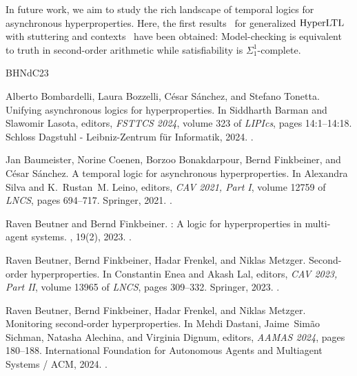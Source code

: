 \documentclass[dvipsnames,10pt,a4paper]{amsart}
\theoremstyle{definition}
\theoremstyle{remark}
\newcommand{\hyltl}{\mathrm{Hyper\-LTL}\xspace}
\begin{document}
In future work, we aim to study the rich landscape of temporal logics for asynchronous hyperproperties. 
Here, the first results~\cite{rz25} for generalized $\hyltl$ with stuttering and contexts~\cite{DBLP:journals/corr/abs-2404-16778} have been obtained: 
Model-checking is equivalent to truth in second-order arithmetic while satisfiability is $\Sigma_1^1$-complete.

\newcommand{\etalchar}[1]{$^{#1}$}
\begin{thebibliography}{BHNdC23}

Alberto Bombardelli, Laura Bozzelli, C{\'{e}}sar S{\'{a}}nchez, and Stefano
  Tonetta.
\newblock Unifying asynchronous logics for hyperproperties.
\newblock In Siddharth Barman and Slawomir Lasota, editors, {\em {FSTTCS}
  2024}, volume 323 of {\em LIPIcs}, pages 14:1--14:18. Schloss Dagstuhl -
  Leibniz-Zentrum für Informatik, 2024.
\newblock \href {https://doi.org/10.4230/LIPICS.FSTTCS.2024.14}
  {}.

\bibitem[BCB{\etalchar{+}}21]{DBLP:conf/cav/BaumeisterCBFS21}
Jan Baumeister, Norine Coenen, Borzoo Bonakdarpour, Bernd Finkbeiner, and
  C{\'{e}}sar S{\'{a}}nchez.
\newblock A temporal logic for asynchronous hyperproperties.
\newblock In Alexandra Silva and K.~Rustan~M. Leino, editors, {\em {CAV} 2021,
  Part {I}}, volume 12759 of {\em LNCS}, pages 694--717. Springer, 2021.
\newblock \href {https://doi.org/10.1007/978-3-030-81685-8\_33}
  {}.

Raven Beutner and Bernd Finkbeiner.
: {A} logic for hyperproperties in multi-agent
  systems.
, 19(2), 2023.
\newblock \href {https://doi.org/10.46298/LMCS-19(2:13)2023}
  {}.

Raven Beutner, Bernd Finkbeiner, Hadar Frenkel, and Niklas Metzger.
\newblock Second-order hyperproperties.
\newblock In Constantin Enea and Akash Lal, editors, {\em {CAV} 2023, Part
  {II}}, volume 13965 of {\em LNCS}, pages 309--332. Springer, 2023.
\newblock \href {https://doi.org/10.1007/978-3-031-37703-7\_15}
  {}.

Raven Beutner, Bernd Finkbeiner, Hadar Frenkel, and Niklas Metzger.
\newblock Monitoring second-order hyperproperties.
\newblock In Mehdi Dastani, Jaime~Sim{\~{a}}o Sichman, Natasha Alechina, and
  Virginia Dignum, editors, {\em {AAMAS} 2024}, pages 180--188. International
  Foundation for Autonomous Agents and Multiagent Systems / {ACM}, 2024.
\newblock \href {https://doi.org/10.5555/3635637.3662865}
  {}.


\end{thebibliography}
\end{document}

